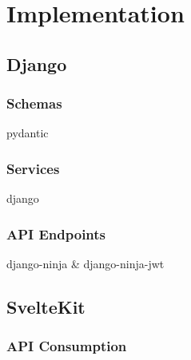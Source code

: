 \section{Implementation}

\subsection{Django}

\subsubsection{Schemas}
pydantic
\subsubsection{Services}
django
\subsubsection{API Endpoints}
django-ninja \& django-ninja-jwt

\subsection{SvelteKit}


\subsubsection{API Consumption}





